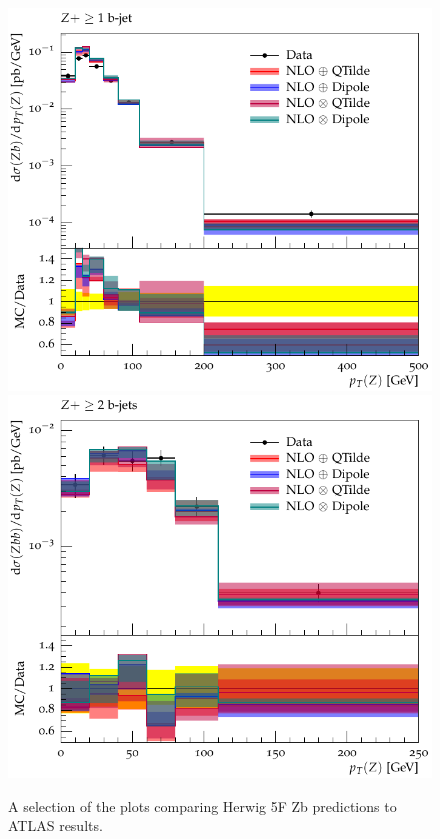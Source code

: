 \documentclass[11pt]{cernrep} \usepackage{graphicx,epsfig} 
\begin{document}
\begin{figure}[htbp]
\begin{center}
   \includegraphics[scale=0.65]{figs/zbb/herwigzb/d15-x01-y01.pdf} 
   \includegraphics[scale=0.65]{figs/zbb/herwigzb/d25-x01-y01.pdf} 
\caption{A selection of the plots comparing Herwig 5F Zb predictions to ATLAS results.}
\label{zbb-herwigzb-atlas}
\end{center}
\end{figure}
\end{document}
